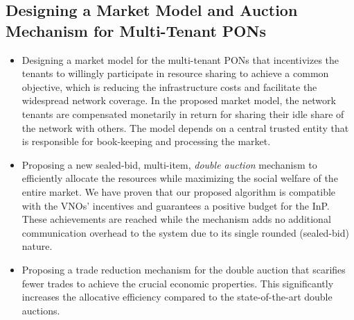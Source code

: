 \subsection{Designing a Market Model and Auction Mechanism for Multi-Tenant \ac{PON}s}
\begin{itemize}

\item Designing a market model for the multi-tenant \acp{PON} that incentivizes the tenants to willingly participate in resource sharing to achieve a common objective, which is reducing the infrastructure costs and facilitate the widespread network coverage. In the proposed market model, the network tenants are compensated monetarily in return for sharing their idle share of the network with others. The model depends on a central trusted entity that is responsible for book-keeping and processing the market.



\item Proposing a new sealed-bid, multi-item, \textit{double auction} mechanism to efficiently allocate the resources while maximizing the social welfare of the entire market. We have proven that our proposed algorithm is compatible with the \acp{VNO}' incentives and guarantees a positive budget for the \ac{InP}. These achievements are reached while the mechanism adds no additional communication overhead to the system due to its single rounded (sealed-bid) nature.


\item Proposing a trade reduction mechanism for the double auction that scarifies fewer trades to achieve the crucial economic properties. This significantly increases the allocative efficiency compared to the state-of-the-art double auctions.


\end{itemize}

